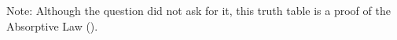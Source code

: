 \begin{subquestions}
\begin{subsubquestions}
Note: Although the question did not ask for it, this truth table is a proof of the Absorptive Law ().

\end{subsubquestions}

\end{subquestions}
